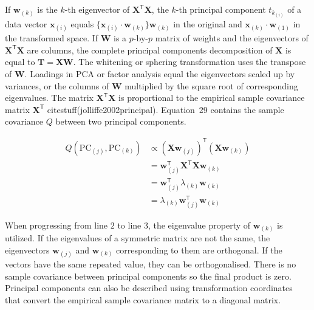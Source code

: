 \documentclass[preprint,12pt]{elsarticle}
\begin{document}
If $\mathbf{w}_{\left(k\right)}$ is the $k$-th eigenvector of $\mathbf{X}^{\mathsf{T}}\mathbf{X}$, the $k$-th principal component $t_{k_{\left(i\right)}}$ of a data vector $\mathbf{x}_{\left(i\right)}$ equals $\{\mathbf{x}_{\left(i\right)} \cdot \mathbf{w}_{\left(k\right)}\} \mathbf{w}_{\left(k\right)}$ in the original and $\mathbf{x}_{\left(k\right)} \cdot \mathbf{w}_{\left(1\right)}$ in the transformed space. If $\mathbf{W}$ is a $p$-by-$p$ matrix of weights and the eigenvectors of $\mathbf{X}^{\mathsf{T}}\mathbf{X}$ are columns, the complete principal components decomposition of $\mathbf{X}$ is equal to $\mathbf{T} =\mathbf{X} \mathbf{W}$. The whitening or sphering transformation uses the transpose of $\mathbf{W}$. Loadings in PCA or factor analysis equal the eigenvectors scaled up by variances, or the columns of $\mathbf{W}$ multiplied by the square root of corresponding eigenvalues. The matrix $\mathbf{X}^{\mathsf{T}}\mathbf{X}$ is proportional to the empirical sample covariance matrix $\mathbf{X}^{\mathsf{T}}$ citestuff(jolliffe2002principal). Equation~29 contains the sample covariance $Q$ between two principal components.

\begin{equation}
	\begin{aligned}
        Q(\mathrm{PC}_{(j)},\mathrm{PC}_{\left(k\right)})&\propto (\mathbf{X} \mathbf{w}_{(j)})^{\mathsf{T}}(\mathbf{X} \mathbf{w}_{\left(k\right)})\\&=\mathbf{w}_{(j)}^{\mathsf{T}}\mathbf{X}^{\mathsf{T}}\mathbf{X} \mathbf{w}_{\left(k\right)}\\&=\mathbf{w}_{(j)}^{\mathsf{T}}\lambda_{\left(k\right)}\mathbf{w}_{\left(k\right)}\\&=\lambda_{\left(k\right)}\mathbf{w}_{(j)}^{\mathsf{T}}\mathbf{w}_{\left(k\right)}
    \end{aligned}
	\label{eqn:29}
\end{equation}

When progressing from line $2$ to line $3$, the eigenvalue property of $\mathbf{w}_{\left(k\right)}$ is utilized. If the eigenvalues of a symmetric matrix are not the same, the eigenvectors $\mathbf{w}_{\left(j\right)}$ and $\mathbf{w}_{\left(k\right)}$ corresponding to them are orthogonal. If the vectors have the same repeated value, they can be orthogonalised. There is no sample covariance between principal components so the final product is zero. Principal components can also be described using transformation coordinates that convert the empirical sample covariance matrix to a diagonal matrix.
\end{document}
